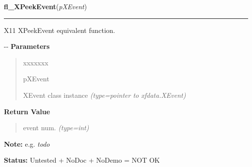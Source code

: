 \hspace{.8\funcindent}\begin{boxedminipage}{\funcwidth}

    \raggedright \textbf{fl\_XPeekEvent}(\textit{pXEvent})

    \vspace{-1.5ex}

    \rule{\textwidth}{0.5\fboxrule}
\setlength{\parskip}{2ex}

X11 XPeekEvent equivalent function.

-{}-
\setlength{\parskip}{1ex}
      \textbf{Parameters}
      \vspace{-1ex}

      \begin{quote}
        \begin{Ventry}{xxxxxxx}

          \item[pXEvent]


XEvent class instance
            {\it (type=pointer to xfdata.XEvent)}

        \end{Ventry}

      \end{quote}

      \textbf{Return Value}
    \vspace{-1ex}

      \begin{quote}

event num.
      {\it (type=int)}

      \end{quote}

\textbf{Note:} 
e.g. \emph{todo}


\textbf{Status:} 
Untested + NoDoc + NoDemo = NOT OK


    \end{boxedminipage}

    \label{xformslib:flxbasic:fl_XEventsQueued}

    \vspace{0.5ex}

